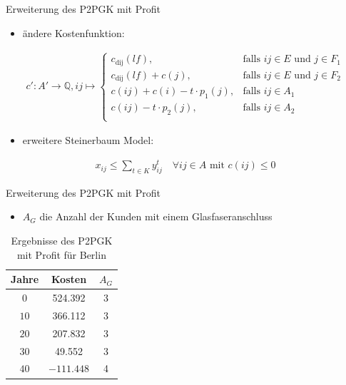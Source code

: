 \documentclass{beamer}
\newcommand{\Q}{\mathbb{Q}}
\begin{document}
		\begin{frame}{Erweiterung des P2PGK mit Profit}
			\begin{itemize}
				\item ändere Kostenfunktion:
			\end{itemize}
			\begin{align*}
			c': A' \rightarrow \Q, ij \mapsto \left\{\begin{array}{cl} 
			c_{\text{dij}}(lf), & \text{falls } ij \in E \text{ und } j \in F_1\\ 
			c_{\text{dij}}(lf)+c(j), & \text{falls } ij \in E \text{ und } j \in F_2\\ 
			c(ij) + c(i) - t \cdot p_1(j), & \text{falls } ij \in A_1\\ 
			c(ij) - t \cdot p_2(j), & \text{falls } ij \in A_2\\ 
			\end{array}
			\right.
			\end{align*}
			\begin{itemize}
				\item erweitere Steinerbaum Model:
			\end{itemize}
			\begin{align*}
			x_{ij} \leq \displaystyle\sum_{t \in K} y_{ij}^t \quad \forall ij \in A \text{ mit } c(ij) \leq 0
			\end{align*}
			\end{frame}
		\begin{frame}{Erweiterung des P2PGK mit Profit}
			\begin{itemize}
				\item $A_G$ die Anzahl der Kunden mit einem Glasfaseranschluss
			\end{itemize}

			\begin{table}[h]
				\centering
				\begin{tabular}{c|c|c}
					\centering
					Jahre & Kosten & $A_G$ \\	
					\hline
					$0$   	 &  524.392 & 3  \\
					$10$ 	&   366.112& 3  \\
					$20$   	&   207.832 & 3  \\
					$30$    &   49.552 & 3  \\
					$40$    & $-111.448$ & 4 \\
				\end{tabular}
				\label{P2PGKProfit}
				\caption{Ergebnisse des P2PGK mit Profit f\"ur Berlin} 
			\end{table}
		\end{frame}
		
\end{document}
